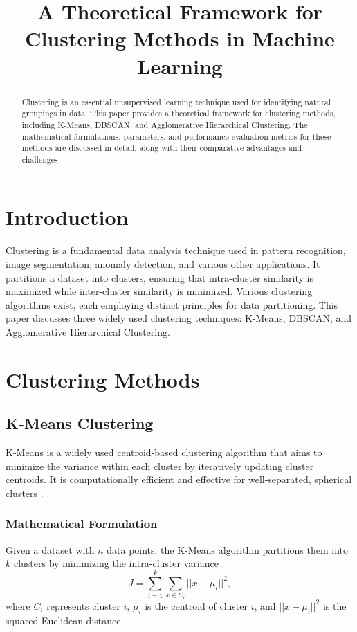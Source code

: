\documentclass{article}
\title{A Theoretical Framework for Clustering Methods in Machine Learning}
\author{}
\date{}
\begin{document}
\maketitle

\begin{abstract}
Clustering is an essential unsupervised learning technique used for identifying natural groupings in data. This paper provides a theoretical framework for clustering methods, including K-Means, DBSCAN, and Agglomerative Hierarchical Clustering. The mathematical formulations, parameters, and performance evaluation metrics for these methods are discussed in detail, along with their comparative advantages and challenges.
\end{abstract}

\section{Introduction}
Clustering is a fundamental data analysis technique used in pattern recognition, image segmentation, anomaly detection, and various other applications. It partitions a dataset into clusters, ensuring that intra-cluster similarity is maximized while inter-cluster similarity is minimized. Various clustering algorithms exist, each employing distinct principles for data partitioning. This paper discusses three widely used clustering techniques: K-Means, DBSCAN, and Agglomerative Hierarchical Clustering.

\section{Clustering Methods}

\subsection{K-Means Clustering}
K-Means is a widely used centroid-based clustering algorithm that aims to minimize the variance within each cluster by iteratively updating cluster centroids. It is computationally efficient and effective for well-separated, spherical clusters \cite{Lloyd1982}.

\subsubsection{Mathematical Formulation}
Given a dataset with $n$ data points, the K-Means algorithm partitions them into $k$ clusters by minimizing the intra-cluster variance \cite{Kanungo2002}:
\begin{equation}
J = \sum_{i=1}^{k} \sum_{x \in C_i} ||x - \mu_i||^2,
\end{equation}
where $C_i$ represents cluster $i$, $\mu_i$ is the centroid of cluster $i$, and $||x - \mu_i||^2$ is the squared Euclidean distance.
\end{document}
